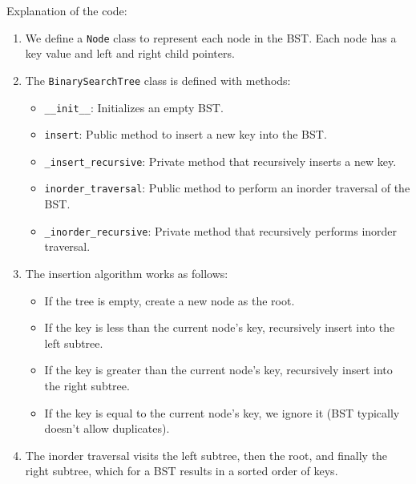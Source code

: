 \begin{Shaded}
\begin{Highlighting}[]
\OperatorTok{=}
\OperatorTok{=}\NormalTok{ [}\NormalTok{, }\NormalTok{, }\NormalTok{, }\NormalTok{, }\NormalTok{, }\NormalTok{, }\NormalTok{]}

\NormalTok{(}

\NormalTok{(}\NormalTok{)}
\end{Highlighting}
\end{Shaded}

Explanation of the code:

\begin{enumerate}
\def\labelenumi{\arabic{enumi}.}
\item
  We define a \texttt{Node} class to represent each node in the BST.
  Each node has a key value and left and right child pointers.
\item
  The \texttt{BinarySearchTree} class is defined with methods:

  \begin{itemize}
  \tightlist
  \item
    \texttt{\_\_init\_\_}: Initializes an empty BST.
  \item
    \texttt{insert}: Public method to insert a new key into the BST.
  \item
    \texttt{\_insert\_recursive}: Private method that recursively
    inserts a new key.
  \item
    \texttt{inorder\_traversal}: Public method to perform an inorder
    traversal of the BST.
  \item
    \texttt{\_inorder\_recursive}: Private method that recursively
    performs inorder traversal.
  \end{itemize}
\item
  The insertion algorithm works as follows:

  \begin{itemize}
  \tightlist
  \item
    If the tree is empty, create a new node as the root.
  \item
    If the key is less than the current node's key, recursively insert
    into the left subtree.
  \item
    If the key is greater than the current node's key, recursively
    insert into the right subtree.
  \item
    If the key is equal to the current node's key, we ignore it (BST
    typically doesn't allow duplicates).
  \end{itemize}
\item
  The inorder traversal visits the left subtree, then the root, and
  finally the right subtree, which for a BST results in a sorted order
  of keys.
\end{enumerate}

